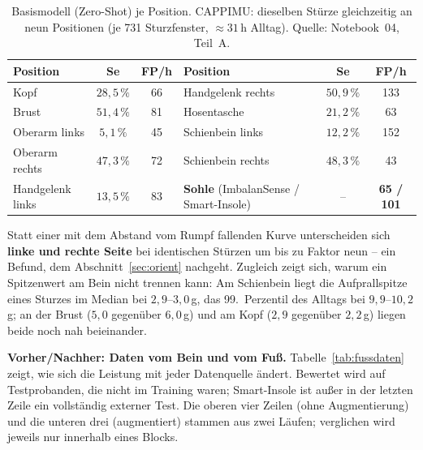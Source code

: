\documentclass[11pt,a4paper,oneside,parskip=half,open=any,
               numbers=noenddot,listof=totoc,bibliography=totoc]{scrreprt}
\begin{document}
\begin{table}[H]
\centering\small
\caption{Basismodell (Zero-Shot) je Position. CAPPIMU: dieselben Stürze
gleichzeitig an neun Positionen (je 731 Sturzfenster, $\approx 31$\,h Alltag).
Quelle: Notebook~04, Teil~A.}
\label{tab:kurve}
\begin{tabularx}{\textwidth}{Y c c | Y c c}
\toprule
\textbf{Position} & \textbf{Se} & \textbf{FP/h} & \textbf{Position} & \textbf{Se} & \textbf{FP/h} \\
\midrule
Kopf              & $28{,}5\,\%$ & 66  & Handgelenk rechts & $50{,}9\,\%$ & 133 \\
Brust             & $51{,}4\,\%$ & 81  & Hosentasche       & $21{,}2\,\%$ & 63 \\
Oberarm links     & $5{,}1\,\%$  & 45  & Schienbein links  & $12{,}2\,\%$ & 152 \\
Oberarm rechts    & $47{,}3\,\%$ & 72  & Schienbein rechts & $48{,}3\,\%$ & 43 \\
Handgelenk links  & $13{,}5\,\%$ & 83  & \textbf{Sohle} (ImbalanSense / Smart-Insole) & -- & \textbf{65 / 101} \\
\bottomrule
\end{tabularx}
\end{table}

Statt einer mit dem Abstand vom Rumpf fallenden Kurve unterscheiden sich
\textbf{linke und rechte Seite} bei identischen Stürzen um bis zu Faktor
neun -- ein Befund, dem Abschnitt~\ref{sec:orient} nachgeht. Zugleich
zeigt sich, warum ein Spitzenwert am Bein nicht trennen kann: Am
Schienbein liegt die Aufprallspitze eines Sturzes im Median bei
$2{,}9$--$3{,}0$\,g, das 99.~Perzentil des Alltags bei $9{,}9$--$10{,}2$\,g;
an der Brust ($5{,}0$ gegenüber $6{,}0$\,g) und am Kopf ($2{,}9$ gegenüber
$2{,}2$\,g) liegen beide noch nah beieinander.

\textbf{Vorher/Nachher: Daten vom Bein und vom Fuß.}
Tabelle~\ref{tab:fussdaten} zeigt, wie sich die Leistung mit jeder
Datenquelle ändert. Bewertet wird auf Testprobanden, die nicht im
Training waren; Smart-Insole ist außer in der letzten Zeile ein
vollständig externer Test. Die oberen vier Zeilen (ohne Augmentierung)
und die unteren drei (augmentiert) stammen aus zwei Läufen; verglichen
wird jeweils nur innerhalb eines Blocks.
\end{document}
